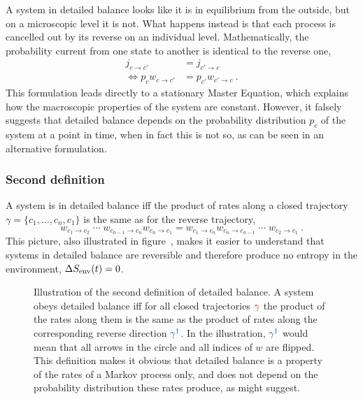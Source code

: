 A system in detailed balance looks like it is in equilibrium from the outside, but on a microscopic level it is not. What happens instead is that each process is cancelled out by its reverse on an individual level. Mathematically, the probability current from one state to another is identical to the reverse one,
%
\begin{equation}\begin{split}
	\label{eqn:db first def}
	j_{c\to c'} &= j_{c'\to c} \\
	\Leftrightarrow p_cw_{c\to c'} &= p_{c'}w_{c'\to c} ~.
\end{split}\end{equation}
%
This formulation leads directly to a stationary Master Equation, which explains how the macroscopic properties of the system are constant. However, it falsely suggests that detailed balance depends on the probability distribution \(p_c\) of the system at a point in time, when in fact this is not so, as can be seen in an alternative formulation.


\subsubsection{Second definition}

A system is in detailed balance iff the product of rates along a closed trajectory \(\gamma = \{c_1,\ldots,c_n,c_1\}\) is the same as for the reverse trajectory,
%
\begin{equation}
	w_{c_1\to c_2} \; \cdots \; w_{c_{n-1}\to c_n}w_{c_n\to c_1}
	=
	w_{c_1\to c_n}w_{c_n\to c_{n-1}} \; \cdots \; w_{c_2\to c_1} ~.
\end{equation}
%
This picture, also illustrated in figure~, makes it easier to understand that systems in detailed balance are reversible and therefore produce no entropy in the environment, \(\Delta S_\text{env}(t)=0\).

\begin{figure}[htbp]
	\centering
	
	\caption[]{Illustration of the second definition of detailed balance. A system obeys detailed balance iff for all closed trajectories \({\color{red}\gamma}\) the product of the rates along them is the same as the product of rates along the corresponding reverse direction \({\color{blue}\gamma^\dagger}\). In the illustration, \({\color{blue}\gamma^\dagger}\) would mean that all arrows in the circle and all indices of \(w\) are flipped. This definition makes it obvious that detailed balance is a property of the rates of a Markov process only, and does not depend on the probability distribution these rates produce, as  might suggest.}
	\label{fig:pathcircle}
\end{figure}





